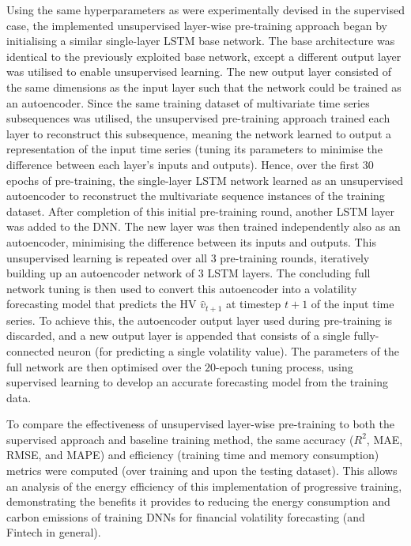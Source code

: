\documentclass[a4paper, 11pt]{report}
\begin{document}
    Using the same hyperparameters as were experimentally devised in the supervised case, the implemented unsupervised layer-wise pre-training approach began by initialising a similar single-layer LSTM base network. The base architecture was identical to the previously exploited base network, except a different output layer was utilised to enable unsupervised learning. The new output layer consisted of the same dimensions as the input layer such that the network could be trained as an autoencoder. Since the same training dataset of multivariate time series subsequences was utilised, the unsupervised pre-training approach trained each layer to reconstruct this subsequence, meaning the network learned to output a representation of the input time series (tuning its parameters to minimise the difference between each layer's inputs and outputs). Hence, over the first $30$ epochs of pre-training, the single-layer LSTM network learned as an unsupervised autoencoder to reconstruct the multivariate sequence instances of the training dataset. After completion of this initial pre-training round, another LSTM layer was added to the DNN. The new layer was then trained independently also as an autoencoder, minimising the difference between its inputs and outputs. This unsupervised learning is repeated over all $3$ pre-training rounds, iteratively building up an autoencoder network of $3$ LSTM layers. The concluding full network tuning is then used to convert this autoencoder into a volatility forecasting model that predicts the HV $\hat{v}_{t+1}$ at timestep $t+1$ of the input time series. To achieve this, the autoencoder output layer used during pre-training is discarded, and a new output layer is appended that consists of a single fully-connected neuron (for predicting a single volatility value). The parameters of the full network are then optimised over the $20$-epoch tuning process, using supervised learning to develop an accurate forecasting model from the training data.

    To compare the effectiveness of unsupervised layer-wise pre-training to both the supervised approach and baseline training method, the same accuracy ($R^2$, MAE, RMSE, and MAPE) and efficiency (training time and memory consumption) metrics were computed (over training and upon the testing dataset). This allows an analysis of the energy efficiency of this implementation of progressive training, demonstrating the benefits it provides to reducing the energy consumption and carbon emissions of training DNNs for financial volatility forecasting (and Fintech in general).
\end{document}
